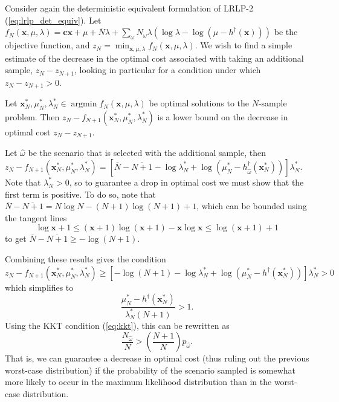 \documentclass[11pt]{article}
\newcommand{\x}{\mathbf{x}}
\renewcommand{\c}{\mathbf{c}}
\DeclareMathOperator*{\argmin}{argmin}
\begin{document}
Consider again the deterministic equivalent formulation of LRLP-2 (\ref{eq:lrlp_det_equiv}).  Let $f_N(\x,\mu,\lambda) =  \c\x + \mu + \bar{N}\lambda + \sum_\omega N_\omega\lambda(\log\lambda - \log(\mu-h^\dagger(\x)))$ be the objective function, and $z_N = \min_{\x,\mu,\lambda} f_N(\x,\mu,\lambda)$.  We wish to find a simple estimate of the decrease in the optimal cost associated with taking an additional sample, $z_N - z_{N+1}$, looking in particular for a condition under which $z_N - z_{N+1} > 0$.

Let $\x^*_N, \mu^*_N,\lambda^*_N \in \argmin f_N(\x,\mu,\lambda)$ be optimal solutions to the $N$-sample problem.  Then $z_N - f_{N+1}(\x^*_N,\mu^*_N,\lambda^*_N)$ is a lower bound on the decrease in optimal cost $z_N - z_{N+1}$.

Let $\hat{\omega}$ be the scenario that is selected with the additional sample, then $z_N - f_{N+1}(\x^*_N,\mu^*_N,\lambda^*_N) = \left[ \overline{N} - \overline{N+1} - \log \lambda^*_N + \log(\mu^*_N - h^\dagger_{\hat{\omega}}(\x^*_N)) \right] \lambda^*_N$.  Note that $\lambda^*_N > 0$, so to guarantee a drop in optimal cost we must show that the first term is positive.  To do so, note that $\overline{N} - \overline{N+1} = N\log N - (N+1)\log(N+1) + 1$, which can be bounded using the tangent lines
\[
	\log \x + 1 \leq (\x+1)\log(\x+1) - \x\log \x \leq \log(\x+1) + 1
\]
to get $\overline{N} - \overline{N+1} \geq -\log(N+1)$.

Combining these results gives the condition
\[
	z_N - f_{N+1}(\x^*_N,\mu^*_N,\lambda^*_N) \geq \left[ -\log(N+1) - \log\lambda^*_N + \log(\mu^*_N-h^\dagger(\x^*_N))\right]\lambda^*_N > 0
\]
which simplifies to
\[
	\frac{\mu^*_N - h^\dagger(\x^*_N)}{\lambda^*_N(N+1)} > 1.
\]
Using the KKT condition (\ref{eq:kkt}), this can be rewritten as
\[
	\frac{N_{\hat{\omega}}}{N} > \left( \frac{N+1}{N} \right) p_{\hat{\omega}}.
\]
That is, we can guarantee a decrease in optimal cost (thus ruling out the previous worst-case distribution) if the probability of the scenario sampled is somewhat more likely to occur in the maximum likelihood distribution than in the worst-case distribution.
\end{document}
